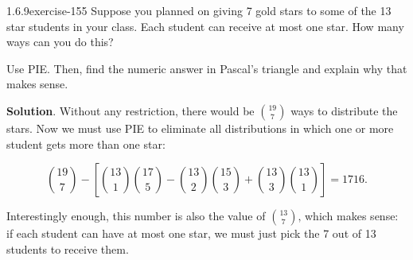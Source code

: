 \documentclass[twoside,11pt,]{book}
\numberwithin{equation}{chapter}
\begin{document}
\begin{divisionsolution}{1.6.9}{}{exercise-155}%
\hypertarget{p-2566}{}%
Suppose you planned on giving 7 gold stars to some of the 13 star students in your class. Each student can receive at most one star. How many ways can you do this?%
\par
\hypertarget{p-2568}{}%
Use PIE. Then, find the numeric answer in Pascal's triangle and explain why that makes sense.%
\par\smallskip%
\noindent\textbf{Solution}.\quad%
\hypertarget{p-2569}{}%
Without any restriction, there would be \({19\choose 7}\) ways to distribute the stars. Now we must use PIE to eliminate all distributions in which one or more student gets more than one star:%
\par
\hypertarget{p-2570}{}%
%
\begin{equation*}
{19 \choose 7} - \left[{13 \choose 1}{17 \choose 5} - {13\choose 2}{15 \choose 3} + {13\choose 3}{13 \choose 1}\right] = 1716
\text{.}
\end{equation*}
%
\par
\hypertarget{p-2571}{}%
Interestingly enough, this number is also the value of \({13 \choose 7}\text{,}\) which makes sense: if each student can have at most one star, we must just pick the 7 out of 13 students to receive them.%
\end{divisionsolution}%
\end{document}
